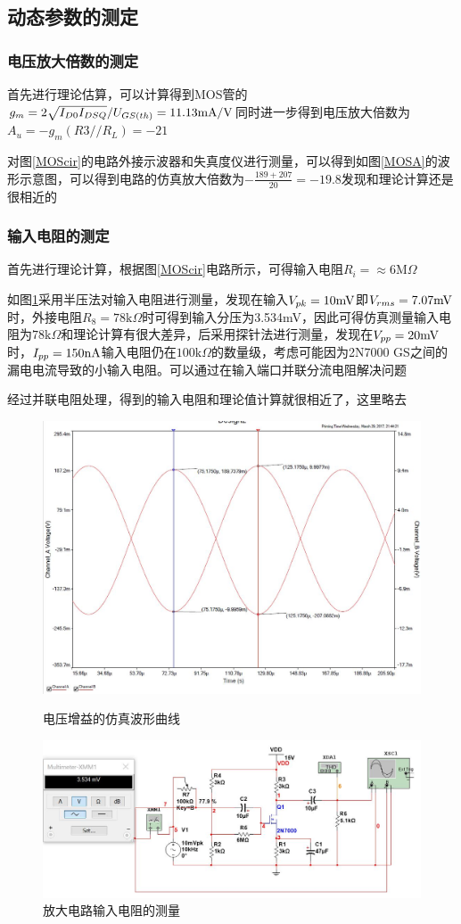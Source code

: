 \documentclass[UTF8,a4paper]{ctexart}
\begin{document}
\subsection{动态参数的测定}
\subsubsection{电压放大倍数的测定}
首先进行理论估算，可以计算得到MOS管的$g_m=2\sqrt{I_{D0}I_{DSQ}}/U_{GS(th)}=11.13\rm{mA/V}$同时进一步得到电压放大倍数为$A_u=-g_m(R3//R_L)=-21$

对图\ref{MOScir}的电路外接示波器和失真度仪进行测量，可以得到如图\ref{MOSA}的波形示意图，可以得到电路的仿真放大倍数为$-\frac{189+207}{20}=-19.8$发现和理论计算还是很相近的
\subsubsection{输入电阻的测定}
首先进行理论计算，根据图\ref{MOScir}电路所示，可得输入电阻$R_i=\approx6\mathrm{M}\Omega$

如图\ref{MOSri}采用半压法对输入电阻进行测量，发现在输入$V_{pk}=10\rm{mV}$即$V_{rms}=7.07\rm{mV}$时，外接电阻$R_8=78\mathrm{k}\Omega$时可得到输入分压为3.534mV，因此可得仿真测量输入电阻为$78\mathrm{k}\Omega$和理论计算有很大差异，后采用探针法进行测量，发现在$V_{pp}=20\rm{mV}$时，$I_{pp}=150\rm{nA}$输入电阻仍在$100\mathrm{k}\Omega$的数量级，考虑可能因为2N7000  GS之间的漏电电流导致的小输入电阻。可以通过在输入端口并联分流电阻解决问题

经过并联电阻处理，得到的输入电阻和理论值计算就很相近了，这里略去
\begin{figure}
\centering
\includegraphics[width=\textwidth]{2-3AA.jpg}
\caption{电压增益的仿真波形曲线}
\label{MOSA}
\includegraphics[width=\textwidth]{2-4Ri.jpg}
\caption{放大电路输入电阻的测量}
\label{MOSri}
\end{figure}
\end{document}
